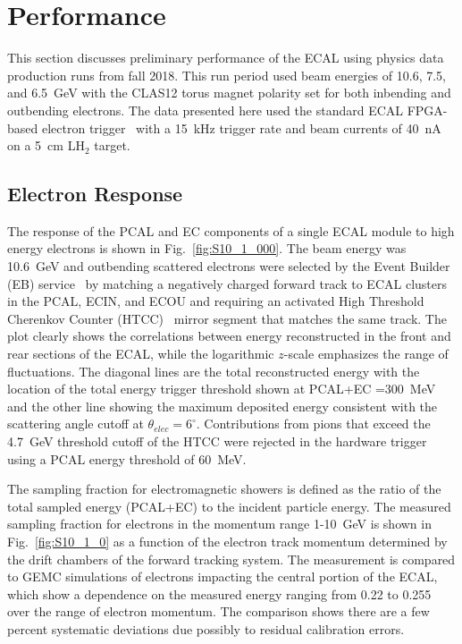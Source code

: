 \section{Performance}
\label{Performance}

This section discusses preliminary performance of the ECAL using physics data production runs from fall 2018.
This run period used beam energies of 10.6, 7.5, and 6.5~GeV with the CLAS12 torus magnet polarity set for
both inbending and outbending electrons. The data presented here used the standard ECAL FPGA-based electron
trigger~\cite{nim:trig} with a 15~kHz trigger rate and beam currents of 40~nA on a 5~cm LH$_2$ target.

\subsection{Electron Response}

The response of the PCAL and EC components of a single ECAL module to high energy electrons is shown in
Fig.~\ref{fig:S10_1_000}. The beam energy was 10.6~GeV and outbending scattered electrons were selected by
the Event Builder (EB) service~\cite{nim:recon} by matching a negatively charged forward track to ECAL clusters
in the PCAL, ECIN, and ECOU and requiring an activated High Threshold Cherenkov Counter (HTCC)~\cite{nim:htcc}
mirror segment that matches the same track. The plot clearly shows the correlations between energy reconstructed
in the front and rear sections of the ECAL, while the logarithmic $z$-scale emphasizes the range of fluctuations.
The diagonal lines are the total reconstructed  energy with the location of the total energy trigger threshold shown
at PCAL+EC =300~MeV and the other line showing the maximum deposited energy consistent with the scattering
angle cutoff at $\theta_{elec}=6^\circ$. Contributions from pions that exceed the 4.7~GeV threshold cutoff of the
HTCC were rejected in the hardware trigger using a PCAL energy threshold of 60~MeV.

The sampling fraction for electromagnetic showers is defined as the ratio of the total sampled energy (PCAL+EC)
to the incident particle energy. The measured sampling fraction for electrons in the momentum range 1-10~GeV is
shown in Fig.~\ref{fig:S10_1_0} as a function of the electron track momentum determined by the drift chambers
\cite{nim:dc} of the forward tracking system. The measurement is compared to GEMC simulations of electrons
impacting the central portion of the ECAL, which show a dependence on the measured energy ranging from 0.22 to
0.255 over the range of electron momentum. The comparison shows there are a few percent systematic deviations
due possibly to residual calibration errors.

